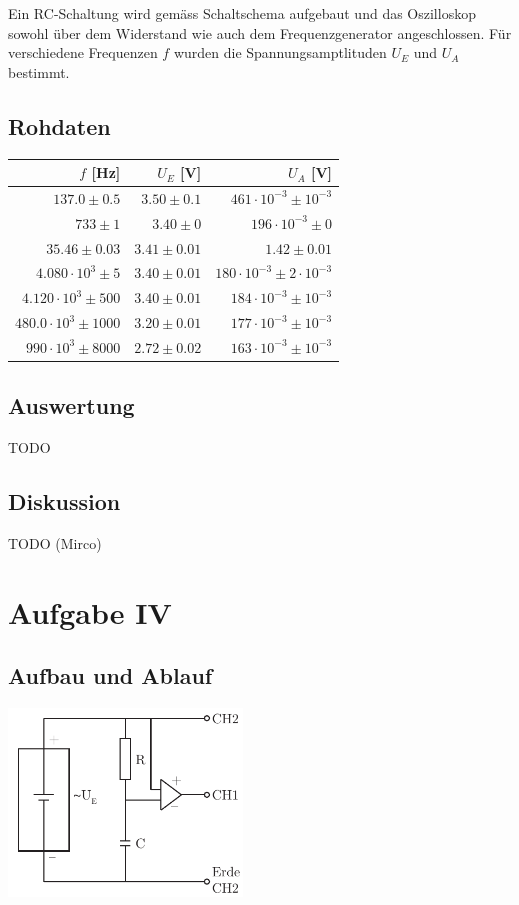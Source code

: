 \documentclass[12pt,a4paper]{article}
\begin{document}
\noindent
Ein RC-Schaltung wird gem\"ass Schaltschema aufgebaut und das Oszilloskop sowohl \"uber dem Widerstand wie auch dem Frequenzgenerator angeschlossen. F\"ur verschiedene Frequenzen $f$ wurden die Spannungsamptlituden $U_E$ und $U_A$ bestimmt.

\subsection*{Rohdaten} 
\begin{tabular}{|r|r|r|}
\hline
$f$ [Hz]&$U_E$ [V]&$U_A$ [V]\\
\hline
$137.0 \pm 0.5$&$3.50 \pm 0.1$&$461\cdot 10^{-3} \pm 10^{-3}$\\
$733 \pm 1$&$3.40 \pm 0$&$196\cdot 10^{-3} \pm 0$\\
$35.46 \pm 0.03$&$3.41 \pm 0.01$&$1.42 \pm 0.01$\\
$4.080\cdot 10^{3} \pm 5$&$3.40 \pm 0.01$&$180\cdot 10^{-3} \pm 2\cdot 10^{-3}$\\
$4.120\cdot 10^{3} \pm 500$&$3.40 \pm 0.01$&$184\cdot 10^{-3} \pm 10^{-3}$\\
$480.0\cdot 10^{3} \pm 1000$&$3.20 \pm 0.01$&$177\cdot 10^{-3} \pm 10^{-3}$\\
$990\cdot 10^{3} \pm 8000$&$2.72 \pm 0.02$&$163\cdot 10^{-3} \pm 10^{-3}$\\
\hline
\end{tabular}

\subsection*{Auswertung}
TODO

\subsection*{Diskussion}
TODO (Mirco)


\section*{Aufgabe IV}
\subsection*{Aufbau und Ablauf}
\includegraphics[height=5cm]{illustration4.pdf}
\end{document}
